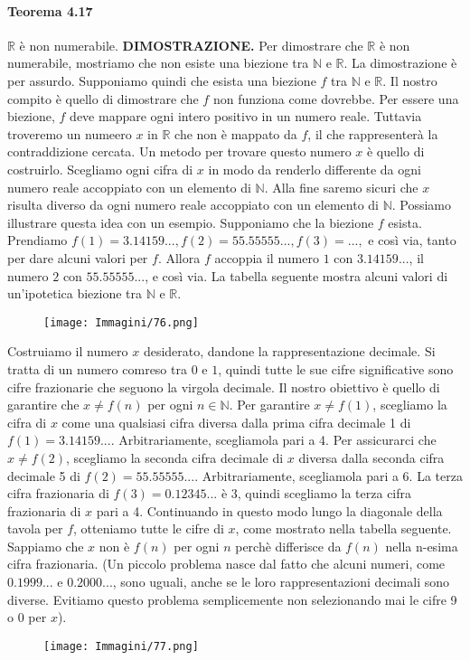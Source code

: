 \documentclass{article}
\begin{document}
\paragraph{Teorema 4.17}
\label{teorema-4.17}
\text{}
\newline
$\mathbb{R}$ è non numerabile.  
\vspace{1em}
\text{}
\newline
\hbox{\textbf{DIMOSTRAZIONE.}}
Per dimostrare che $\mathbb{R}$ è non numerabile, mostriamo che non esiste una biezione tra $\mathbb{N}$ e $\mathbb{R}$.
La dimostrazione è per assurdo.
Supponiamo quindi che esista una biezione $f$ tra $\mathbb{N}$ e $\mathbb{R}$.
Il nostro compito è quello di dimostrare che $f$ non funziona come dovrebbe.
Per essere una biezione, $f$ deve mappare ogni intero positivo in un numero reale.
Tuttavia troveremo un numeero $x$ in $\mathbb{R}$ che non è mappato da $f$, il che rappresenterà la contraddizione cercata.
Un metodo per trovare questo numero $x$ è quello di costruirlo.
Scegliamo ogni cifra di $x$ in modo da renderlo differente da ogni numero reale accoppiato con un elemento di $\mathbb{N}$.
Alla fine saremo sicuri che $x$ risulta diverso da ogni numero reale accoppiato con un elemento di $\mathbb{N}$.
Possiamo illustrare questa idea con un esempio.
Supponiamo che la biezione $f$ esista.
Prendiamo $f(1) = 3.14159...,f(2) = 55.55555...,f(3)=...,$ e così via, tanto per dare alcuni valori per $f$.
Allora $f$ accoppia il numero $1$ con $3.14159...$, il numero $2$ con $55.55555...$, e così via.
La tabella seguente mostra alcuni valori di un'ipotetica biezione tra $\mathbb{N}$ e $\mathbb{R}$.
\begin{figure}[H]
    \centering
    \texttt{[image: Immagini/76.png]}
    \label{figura-4.18}
\end{figure}
Costruiamo il numero $x$ desiderato, dandone la rappresentazione decimale.
Si tratta di un numero comreso tra $0$ e $1$, quindi tutte le sue cifre significative sono cifre frazionarie che seguono la virgola decimale.
Il nostro obiettivo è quello di garantire che $x \neq f(n)$ per ogni $n \in \mathbb{N}$.
Per garantire $x \neq f(1)$, scegliamo la cifra di $x$ come una qualsiasi cifra diversa dalla prima cifra decimale 1 di $f(1) = 3.14159...$.
Arbitrariamente, scegliamola pari a 4.
Per assicurarci che $x \neq f(2)$, scegliamo la seconda cifra decimale di $x$ diversa dalla seconda cifra decimale 5 di $f(2) = 55.55555...$.
Arbitrariamente, scegliamola pari a 6.
La terza cifra frazionaria di $f(3) = 0.12345...$ è 3, quindi scegliamo la terza cifra frazionaria di $x$ pari a 4.
Continuando in questo modo lungo la diagonale della tavola per $f$, otteniamo tutte le cifre di $x$, come mostrato nella tabella seguente.
Sappiamo che $x$ non è $f(n)$ per ogni $n$ perchè differisce da $f(n)$ nella n-esima cifra frazionaria.
(Un piccolo problema nasce dal fatto che alcuni numeri, come $0.1999...$ e $0.2000...$, sono uguali, anche se le loro rappresentazioni decimali sono diverse.
Evitiamo questo problema semplicemente non selezionando mai le cifre 9 o 0 per $x$).
\begin{figure}[H]
    \centering
    \texttt{[image: Immagini/77.png]}
    \label{figura-4.19}
\end{figure}
\end{document}
